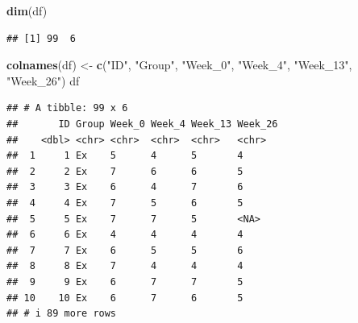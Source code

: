 \documentclass[
]{article}
\newenvironment{Shaded}{\begin{snugshade}}{\end{snugshade}}
\newcommand{\FunctionTok}[1]{\textcolor[rgb]{0.13,0.29,0.53}{\textbf{#1}}}
\newcommand{\NormalTok}[1]{#1}
\newcommand{\OtherTok}[1]{\textcolor[rgb]{0.56,0.35,0.01}{#1}}
\newcommand{\StringTok}[1]{\textcolor[rgb]{0.31,0.60,0.02}{#1}}
\begin{document}
\begin{Shaded}
\begin{Highlighting}[]
\FunctionTok{dim}\NormalTok{(df)}
\end{Highlighting}
\end{Shaded}

\begin{verbatim}
## [1] 99  6
\end{verbatim}

\begin{Shaded}
\begin{Highlighting}[]
\FunctionTok{colnames}\NormalTok{(df) }\OtherTok{\textless{}{-}} \FunctionTok{c}\NormalTok{(}\StringTok{"ID"}\NormalTok{, }\StringTok{"Group"}\NormalTok{, }\StringTok{"Week\_0"}\NormalTok{, }
                \StringTok{"Week\_4"}\NormalTok{, }\StringTok{"Week\_13"}\NormalTok{, }\StringTok{"Week\_26"}\NormalTok{)}
\NormalTok{df}
\end{Highlighting}
\end{Shaded}

\begin{verbatim}
## # A tibble: 99 x 6
##       ID Group Week_0 Week_4 Week_13 Week_26
##    <dbl> <chr> <chr>  <chr>  <chr>   <chr>  
##  1     1 Ex    5      4      5       4      
##  2     2 Ex    7      6      6       5      
##  3     3 Ex    6      4      7       6      
##  4     4 Ex    7      5      6       5      
##  5     5 Ex    7      7      5       <NA>   
##  6     6 Ex    4      4      4       4      
##  7     7 Ex    6      5      5       6      
##  8     8 Ex    7      4      4       4      
##  9     9 Ex    6      7      7       5      
## 10    10 Ex    6      7      6       5      
## # i 89 more rows
\end{verbatim}
\end{document}
